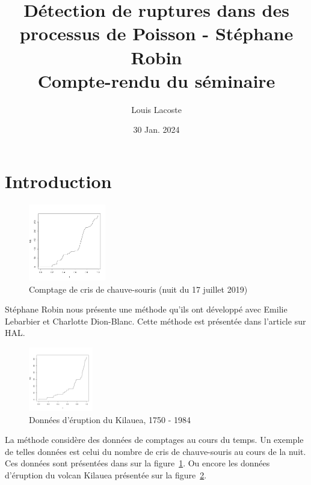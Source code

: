 \documentclass[a4paper,10pt]{article}\usepackage[]{graphicx}\usepackage[]{xcolor}
\title{\vspace{-1.5cm}\large Détection de ruptures dans des processus de Poisson - Stéphane Robin\\
\small Compte-rendu du séminaire\vspace{-0.5cm}}
\date{\tiny 30 Jan. 2024}
\author{\small Louis Lacoste}
\begin{document}
\maketitle

\section{Introduction}

\begin{figure}
    \centering
    \includegraphics[width=0.3\textwidth]{graph-cris-chauve-souris}
    \caption{Comptage de cris de chauve-souris (nuit du 17 juillet 2019)}
    \label{fig:graph-cris-chauve-souris}
\end{figure}

Stéphane Robin nous présente une méthode qu'ils ont développé avec Emilie Lebarbier
et Charlotte Dion-Blanc. Cette méthode est présentée dans l'article 
\cite{dion-blancDetectionRupturesMultiples2023} sur HAL.

\begin{figure}
    \centering
    \includegraphics[width=0.25\textwidth]{graph-eruption-kilauea}
    \caption{Données d'éruption du Kilauea, 1750 - 1984}
    \label{fig:graph-eruption-kilauea}
\end{figure}

La méthode considère des données de comptages au cours du temps. Un exemple de 
telles données est celui du nombre de cris de chauve-souris au cours de la nuit.
Ces données sont présentées dans sur la figure~\ref{fig:graph-cris-chauve-souris}.
Ou encore les données d'éruption du volcan Kilauea présentée sur la figure~\ref{fig:graph-eruption-kilauea}.
\end{document}
